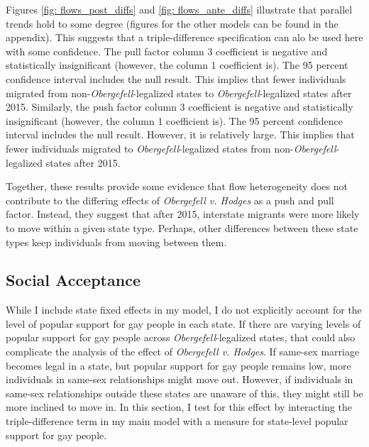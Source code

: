 \documentclass[12pt,letterpaper]{article}
\begin{document}
Figures \ref{fig: flows_post_diffs} and \ref{fig: flows_ante_diffs} illustrate that parallel trends hold to some degree (figures for the other models can be found in the appendix). This suggests that a triple-difference specification can alo be used here with some confidence. The pull factor column 3 coefficient is negative and statistically insignificant (however, the column 1 coefficient is). The 95 percent confidence interval includes the null result. This implies that fewer individuals migrated from non-\textit{Obergefell}-legalized states to \textit{Obergefell}-legalized states after 2015.  Similarly, the push factor column 3 coefficient is negative and statistically insignificant (however, the column 1 coefficient is). The 95 percent confidence interval includes the null result. However, it is relatively large. This implies that fewer individuals migrated to \textit{Obergefell}-legalized states from non-\textit{Obergefell}-legalized states after 2015. 

Together, these results provide some evidence that flow heterogeneity does not contribute to the differing effects of \textit{Obergefell v. Hodges} as a push and pull factor. Instead, they suggest that after 2015, interstate migrants were more likely to move within a given state type. Perhaps, other differences between these state types keep individuals from moving between them.

\FloatBarrier
\subsection{Social Acceptance}

While I include state fixed effects in my model, I do not explicitly account for the level of popular support for gay people in each state. If there are varying levels of popular support for gay people across \textit{Obergefell}-legalized states, that could also complicate the analysis of the effect of \textit{Obergefell v. Hodges}. If same-sex marriage becomes legal in a state, but popular support for gay people remains low, more individuals in same-sex relationships might move out. However, if individuals in same-sex relationships outside these states are unaware of this, they might still be more inclined to move in. In this section, I test for this effect by interacting the triple-difference term in my main model with a measure for state-level popular support for gay people.
\end{document}
